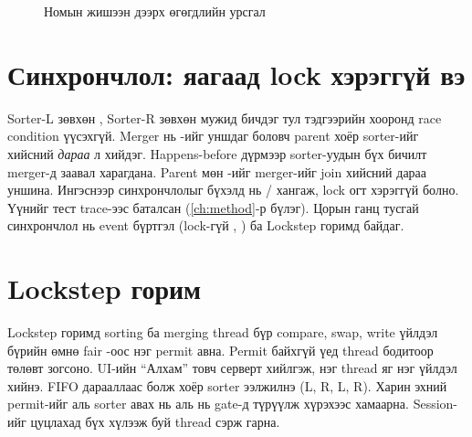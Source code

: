 \begin{figure}[H]
\caption{Номын жишээн дээрх өгөгдлийн урсгал}
\label{fig:flow}
\end{figure}

\section{Синхрончлол: яагаад lock хэрэггүй вэ}\label{sec:nolock}
Sorter-L зөвхөн \code{[0, mid)}, Sorter-R зөвхөн \code{[mid, n)} мужид бичдэг тул тэдгээрийн хооронд race condition
үүсэхгүй. Merger нь -ийг уншдаг боловч parent хоёр sorter-ийг  хийсний \emph{дараа} л
 хийдэг. Happens-before дүрмээр sorter-уудын бүх бичилт merger-д заавал харагдана. Parent мөн
-ийг merger-ийг join хийсний дараа уншина. Ингэснээр синхрончлолыг бүхэлд нь /
хангаж, lock огт хэрэггүй болно. Үүнийг тест trace-ээс баталсан (\ref{ch:method}-р бүлэг). Цорын ганц тусгай
синхрончлол нь event бүртгэл (lock-гүй , ) ба Lockstep горимд байдаг.

\section{Lockstep горим}\label{sec:lockstep}
Lockstep горимд sorting ба merging thread бүр compare, swap, write үйлдэл бүрийн өмнө fair -оос
нэг permit авна. Permit байхгүй үед thread бодитоор  төлөвт зогсоно. UI-ийн “Алхам” товч серверт
 хийлгэж, нэг thread яг нэг үйлдэл хийнэ. FIFO дарааллаас болж хоёр sorter ээлжилнэ (L, R, L, R).
Харин эхний permit-ийг аль sorter авах нь аль нь gate-д түрүүлж хүрэхээс хамаарна. Session-ийг цуцлахад бүх
хүлээж буй thread сэрж гарна.

